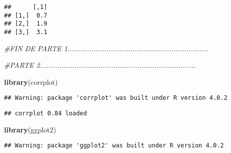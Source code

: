 \documentclass[
]{article}
\newenvironment{Shaded}{\begin{snugshade}}{\end{snugshade}}
\newcommand{\CommentTok}[1]{\textcolor[rgb]{0.56,0.35,0.01}{\textit{#1}}}
\newcommand{\DataTypeTok}[1]{\textcolor[rgb]{0.13,0.29,0.53}{#1}}
\newcommand{\DecValTok}[1]{\textcolor[rgb]{0.00,0.00,0.81}{#1}}
\newcommand{\FloatTok}[1]{\textcolor[rgb]{0.00,0.00,0.81}{#1}}
\newcommand{\KeywordTok}[1]{\textcolor[rgb]{0.13,0.29,0.53}{\textbf{#1}}}
\newcommand{\NormalTok}[1]{#1}
\newcommand{\OperatorTok}[1]{\textcolor[rgb]{0.81,0.36,0.00}{\textbf{#1}}}
\newcommand{\StringTok}[1]{\textcolor[rgb]{0.31,0.60,0.02}{#1}}
\begin{document}
\begin{Shaded}
\end{Shaded}

\begin{verbatim}
##      [,1]
## [1,]  0.7
## [2,]  1.9
## [3,]  3.1
\end{verbatim}

\begin{Shaded}
\begin{Highlighting}[]
\CommentTok{#FIN DE PARTE 1.................................................................}

\CommentTok{#PARTE 2........................................................................}


\KeywordTok{library}\NormalTok{(corrplot)}
\end{Highlighting}
\end{Shaded}

\begin{verbatim}
## Warning: package 'corrplot' was built under R version 4.0.2
\end{verbatim}

\begin{verbatim}
## corrplot 0.84 loaded
\end{verbatim}

\begin{Shaded}
\begin{Highlighting}[]
\KeywordTok{library}\NormalTok{(ggplot2)}
\end{Highlighting}
\end{Shaded}

\begin{verbatim}
## Warning: package 'ggplot2' was built under R version 4.0.2
\end{verbatim}
\end{document}
